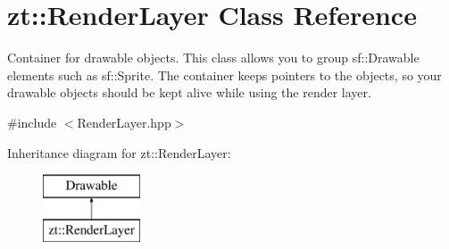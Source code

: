 \hypertarget{classzt_1_1_render_layer}{}\section{zt\+:\+:Render\+Layer Class Reference}
\label{classzt_1_1_render_layer}


Container for drawable objects. This class allows you to group sf\+::\+Drawable elements such as sf\+::\+Sprite. The container keeps pointers to the objects, so your drawable objects should be kept alive while using the render layer.  




{\ttfamily \#include $<$Render\+Layer.\+hpp$>$}

Inheritance diagram for zt\+:\+:Render\+Layer\+:\begin{figure}[H]
\begin{center}
\leavevmode
\includegraphics[height=2.000000cm]{classzt_1_1_render_layer}
\end{center}
\end{figure}
